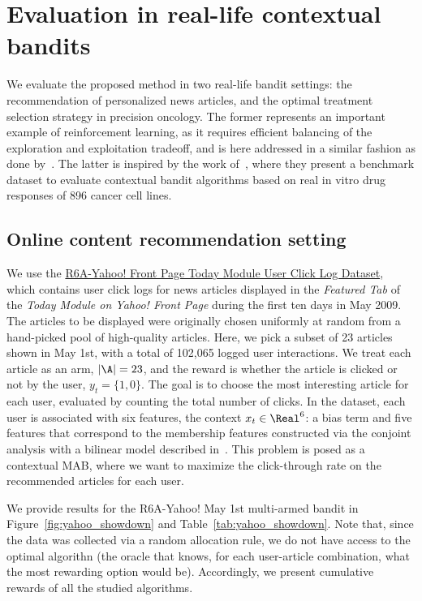 \section{Evaluation in real-life contextual bandits}
\label{asec:evaluation_real_mab}

We evaluate the proposed method in two real-life bandit settings: \ie the recommendation of personalized news articles, and the optimal treatment selection strategy in precision oncology. The former represents an important example of reinforcement learning, as it requires efficient balancing of the exploration and exploitation tradeoff, and is here addressed in a similar fashion as done by~\citet{ic-Chapelle2011}. The latter is inspired by the work of~\citet{j-Rindtorff2019}, where they present a benchmark dataset to evaluate contextual bandit algorithms based on real in vitro drug responses of 896 cancer cell lines.

\subsection{Online content recommendation setting}
\label{ssec:evaluation_real_mab_yahoo}

We use the \href{https://webscope.sandbox.yahoo.com/catalog.php?datatype=r\&did=49}{R6A-Yahoo! Front Page Today Module User Click Log Dataset}, which contains user click logs for news articles displayed in the \textit{Featured Tab} of the \textit{Today Module on Yahoo! Front Page} during the first ten days in May 2009. The articles to be displayed were originally chosen uniformly at random from a hand-picked pool of high-quality articles. Here, we pick a subset of 23 articles shown in May 1st, with a total of 102,065 logged user interactions. We treat each article as an arm, $|\A|=23$, and the reward is whether the article is clicked or not by the user, $y_t=\{1,0\}$. The goal is to choose the most interesting article for each user, evaluated by counting the total number of clicks. In the dataset, each user is associated with six features, \ie the context $x_t\in\Real^{6}$: a bias term and five features that correspond to the membership features constructed via the conjoint analysis with a bilinear model described in~\citep{ip-Chu2009}. This problem is posed as a contextual MAB, where we want to maximize the click-through rate on the recommended articles for each user.

We provide results for the R6A-Yahoo! May 1st multi-armed bandit in Figure~\ref{fig:yahoo_showdown} and Table~\ref{tab:yahoo_showdown}. Note that, since the data was collected via a random allocation rule, we do not have access to the optimal algorithn (\ie the oracle that knows, for each user-article combination, what the most rewarding option would be). Accordingly, we present cumulative rewards of all the studied algorithms.

